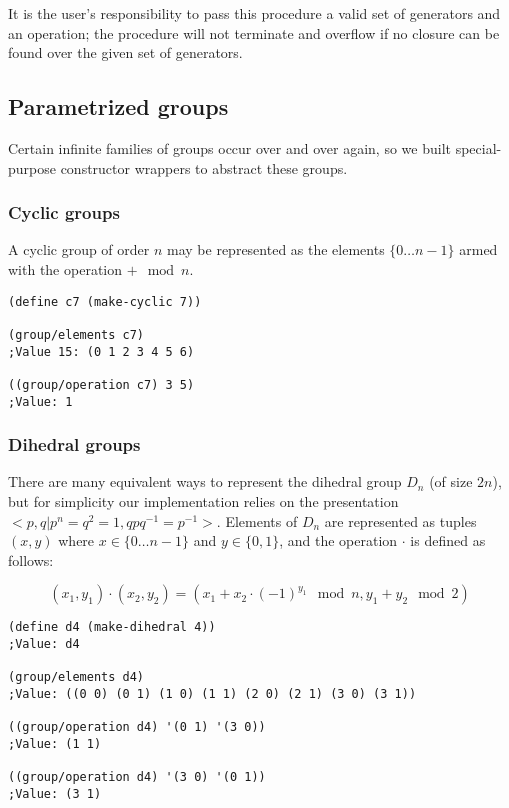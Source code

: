 \documentclass{article}
\begin{document}
            It is the user's responsibility to pass this procedure a valid set of generators and an operation; the procedure will not terminate and overflow if no closure can be found over the given set of generators.
        
        \subsection{Parametrized groups}
        
            Certain infinite families of groups occur over and over again, so we built special-purpose constructor wrappers to abstract these groups.
            
            \subsubsection{Cyclic groups}
            
                A cyclic group of order $n$ may be represented as the elements $\{0 \ldots n-1\}$ armed with the operation $+ \mod n$.
        
\begin{verbatim}         
(define c7 (make-cyclic 7))

(group/elements c7)
;Value 15: (0 1 2 3 4 5 6)

((group/operation c7) 3 5)
;Value: 1
\end{verbatim}
        
            \subsubsection{Dihedral groups}
        
                There are many equivalent ways to represent the dihedral group $D_n$ (of size $2n$), but for simplicity our implementation relies on the presentation $<p,q|p^n = q^2 = 1, qpq^{-1} = p^{-1}>$. Elements of $D_n$ are represented as tuples $(x,y)$ where $x \in \{ 0 \ldots n-1\}$ and $y \in \{0, 1\}$, and the operation $\cdot$ is defined as follows:
        
                $$(x_1,y_1) \cdot (x_2,y_2) = (x_1 + x_2 \cdot (-1)^{y_1} \mod n, y_1 + y_2 \mod 2)$$
        
\begin{verbatim}
(define d4 (make-dihedral 4))
;Value: d4

(group/elements d4)
;Value: ((0 0) (0 1) (1 0) (1 1) (2 0) (2 1) (3 0) (3 1))

((group/operation d4) '(0 1) '(3 0))
;Value: (1 1)

((group/operation d4) '(3 0) '(0 1))
;Value: (3 1)
\end{verbatim}
        
\end{document}
